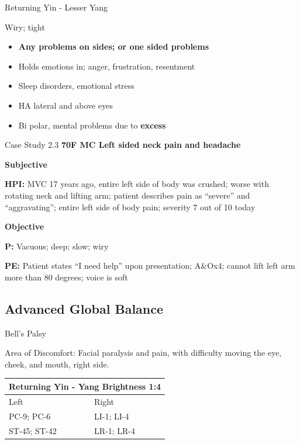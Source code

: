 \begin{frame}{Returning Yin - Lesser Yang}

\begin{pulse}
Wiry; tight
\end{pulse}

\begin{itemize}
\item \textbf{Any problems on sides; or one sided problems}
\item Holds emotions in; anger, frustration, resentment
\item Sleep disorders, emotional stress
\item HA lateral and above eyes
\item Bi polar, mental problems due to \textbf{excess}
\end{itemize}

\end{frame}

\begin{frame}{Case Study 2.3}
  \textbf{\Large 70F MC Left sided neck pain and headache}
  
  \textbf{\large Subjective}
  
  \textbf{HPI:} MVC 17 years ago, entire left side of body was crushed; worse with rotating neck and lifting arm; patient describes pain as ``severe'' and ``aggravating''; entire left side of body pain; severity 7 out of 10 today

  \textbf{\large Objective}
  
  \textbf{P:} Vacuous; deep; slow; wiry 

  \textbf{PE:} Patient states ``I need help'' upon presentation; A\&Ox4; cannot lift left arm more than 80 degrees; voice is soft
\end{frame}

\subsection{Advanced Global Balance}

\begin{frame}{Bell's Palsy}

Area of Discomfort: Facial paralysis and pain, with difficulty moving the eye, cheek, and mouth, right side.

\begin{table}[]
\begin{tabular}{@{}ll@{}}
\toprule
\multicolumn{2}{l}{Returning Yin - Yang Brightness 1:4} \\ \midrule
Left                        & Right                     \\
PC-9; PC-6                  & LI-1; LI-4                \\
ST-45; ST-42                & LR-1; LR-4                \\ \bottomrule
\end{tabular}
\end{table}

\end{frame}

